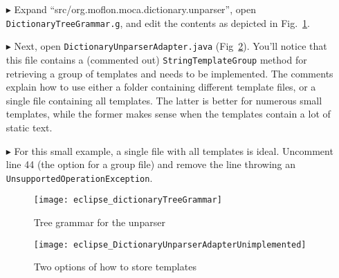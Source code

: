 \begin{itemize}

\item[$\blacktriangleright$] Expand ``src/org.moflon.moca.dictionary.unparser'', open \texttt{Dict\-ion\-ary\-Tree\-Gram\-mar.g}, and edit the contents as
depicted in Fig.~\ref{eclipse:treeGrammar}. 

\vspace{0.5cm}

\item[$\blacktriangleright$] Next, open \texttt{Dict\-ion\-ary\-Un\-pars\-er\-Ad\-ap\-ter.java} (Fig~\ref{eclipse:unparserCommented}). You'll notice that this
file contains a (commented out) \texttt{StringTemplateGroup} meth\-od for retrieving a group of templates and needs to be implemented. The comments explain how to
use either a folder containing different template files, or a single file containing all templates. The latter is better for numerous small templates, while the
former makes sense when the templates contain a lot of static text.

\vspace{0.5cm}

\item[$\blacktriangleright$] For this small example, a single file with all templates is ideal. Uncomment line 44 (the option for a group file) and remove
the line throwing an \texttt{Un\-sup\-port\-ed\-Op\-er\-at\-ion\-Ex\-cep\-tion}.

\newpage 

\vspace*{2cm}

\begin{figure}[htpb]
\begin{center}
  \texttt{[image: eclipse\_dictionaryTreeGrammar]}
  \caption{Tree grammar for the unparser}
  \label{eclipse:treeGrammar}
\end{center}
\end{figure}

\vspace{1cm}

\begin{figure}[htpb]
\hspace{-1cm}
  \texttt{[image: eclipse\_DictionaryUnparserAdapterUnimplemented]}
  \caption{Two options of how to store templates}
  \label{eclipse:unparserCommented}
\end{figure}

\newpage



\end{itemize}
